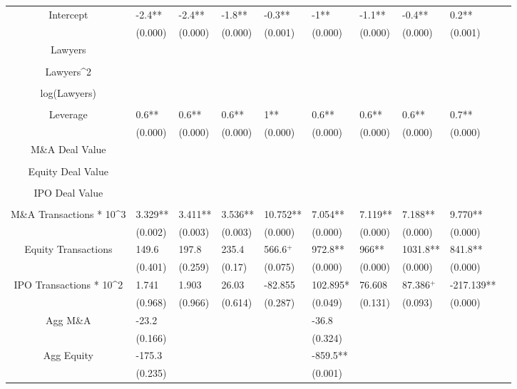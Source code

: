 \documentclass{article}
\begin{document}
\begin{table}[H]
\begin{tabular}{|clllllllll|}
Intercept & -2.4** & -2.4** & -1.8** & -0.3** & -1** & -1.1** & -0.4** & 0.2** & \\ 
   & (0.000) & (0.000) & (0.000) & (0.001) & (0.000) & (0.000) & (0.000) & (0.001) & \\ 
  Lawyers &  &  &  &  &  &  &  &  & \\ 
   &  &  &  &  &  &  &  &  & \\ 
  Lawyers^2 &  &  &  &  &  &  &  &  & \\ 
   &  &  &  &  &  &  &  &  & \\ 
  log(Lawyers) &  &  &  &  &  &  &  &  & \\ 
   &  &  &  &  &  &  &  &  & \\ 
  Leverage & 0.6** & 0.6** & 0.6** & 1** & 0.6** & 0.6** & 0.6** & 0.7** & \\ 
   & (0.000) & (0.000) & (0.000) & (0.000) & (0.000) & (0.000) & (0.000) & (0.000) & \\ 
  M\&A Deal Value &  &  &  &  &  &  &  &  & \\ 
   &  &  &  &  &  &  &  &  & \\ 
  Equity Deal Value &  &  &  &  &  &  &  &  & \\ 
   &  &  &  &  &  &  &  &  & \\ 
  IPO Deal Value &  &  &  &  &  &  &  &  & \\ 
   &  &  &  &  &  &  &  &  & \\ 
  M\&A Transactions * 10^3 & 3.329** & 3.411** & 3.536** & 10.752** & 7.054** & 7.119** & 7.188** & 9.770** & \\ 
   & (0.002) & (0.003) & (0.003) & (0.000) & (0.000) & (0.000) & (0.000) & (0.000) & \\ 
  Equity Transactions & 149.6 & 197.8 & 235.4 & 566.6$^{+}$ & 972.8** & 966** & 1031.8** & 841.8** & \\ 
   & (0.401) & (0.259) & (0.17) & (0.075) & (0.000) & (0.000) & (0.000) & (0.000) & \\ 
  IPO Transactions * 10^2 & 1.741 & 1.903 & 26.03 & -82.855 & 102.895* & 76.608 & 87.386$^{+}$ & -217.139** & \\ 
   & (0.968) & (0.966) & (0.614) & (0.287) & (0.049) & (0.131) & (0.093) & (0.000) & \\ 
  Agg M\&A & -23.2 &  &  &  & -36.8 &  &  &  & \\ 
   & (0.166) &  &  &  & (0.324) &  &  &  & \\ 
  Agg Equity & -175.3 &  &  &  & -859.5** &  &  &  & \\ 
   & (0.235) &  &  &  & (0.001) &  &  &  & \\ 

\end{tabular}
\end{table}
\end{document}
